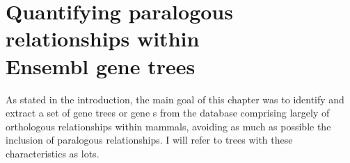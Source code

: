 
\section[Quantifying paralogous relationships within Ensembl gene trees]{Quantifying paralogous relationships within \\ Ensembl gene trees}
\label{section_quantifying_paralogous}

As stated in the introduction, the main goal of this chapter was to
identify and extract a set of gene trees or gene \subtr{}s from the
\cmp database comprising largely of orthologous relationships within
mammals, avoiding as much as possible the inclusion of paralogous
relationships. I will refer to trees with these characteristics as
\acp{lot}.

